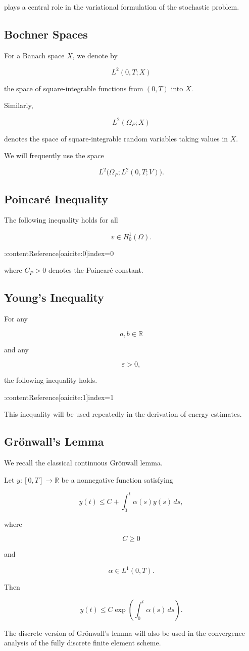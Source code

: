 plays a central role in the variational formulation of the stochastic problem.

\subsection{Bochner Spaces}

For a Banach space $X$, we denote by

\[
L^2(0,T;X)
\]

the space of square-integrable functions from $(0,T)$ into $X$.

Similarly,

\[
L^2(\Omega_P;X)
\]

denotes the space of square-integrable random variables taking values in $X$.

We will frequently use the space

\[
L^2
\bigl(
\Omega_P;
L^2(0,T;V)
\bigr).
\]

\subsection{Poincaré Inequality}

The following inequality holds for all

\[
v\in H_0^1(\Omega).
\]

:contentReference[oaicite:0]{index=0}

where $C_P>0$ denotes the Poincaré constant.

\subsection{Young's Inequality}

For any

\[
a,b\in\mathbb R
\]

and any

\[
\varepsilon>0,
\]

the following inequality holds.

:contentReference[oaicite:1]{index=1}

This inequality will be used repeatedly in the derivation of energy estimates.

\subsection{Grönwall's Lemma}

We recall the classical continuous Grönwall lemma.

\begin{lemma}
Let $y:[0,T]\rightarrow\mathbb R$ be a nonnegative function satisfying

\[
y(t)
\le
C
+
\int_0^t
\alpha(s)y(s)\,ds,
\]

where

\[
C\ge0
\]

and

\[
\alpha\in L^1(0,T).
\]

Then

\[
y(t)
\le
C
\exp
\left(
\int_0^t
\alpha(s)\,ds
\right).
\]

\end{lemma}

The discrete version of Grönwall's lemma will also be used in the convergence analysis of the fully discrete finite element scheme.